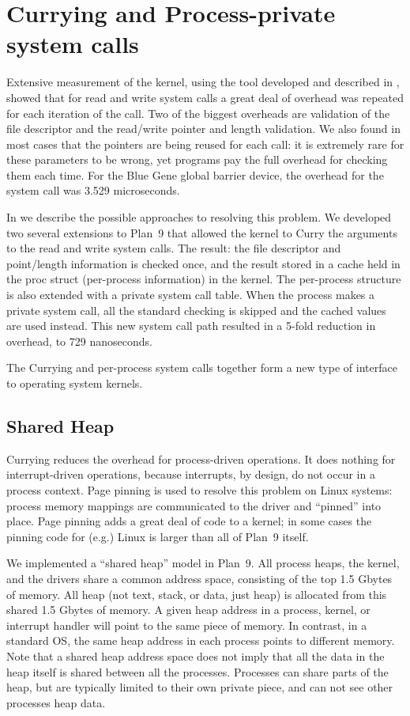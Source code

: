 \section{Currying and Process-private system calls}
Extensive measurement of the kernel, using the tool developed and described in \cite{plan9trace}, showed
that for read and write system calls a great deal of overhead was repeated for each iteration of the 
call. Two of the biggest overheads are validation of the file descriptor and the read/write pointer and 
length validation. We also found in most cases that the pointers are being reused for each call: it is extremely rare for these parameters to be wrong, yet programs pay the full overhead for checking them 
each time. For the Blue Gene global barrier device, the overhead for the system call was 3.529 microseconds. 

In \cite{currying} we describe the possible approaches to resolving this problem. We developed two 
several extensions to Plan~9 that allowed the kernel to Curry the arguments to the read and write
system calls. The result: the file descriptor and point/length information is checked once, and the
result stored in a cache held in the proc struct (per-process information) in the kernel. The per-process structure is 
also extended with a private system call table. When the process makes a private system
call, all the standard checking is skipped and the cached values are used instead. This 
new system call path resulted in a 5-fold reduction in overhead, to 729 nanoseconds. 

The Currying and per-process system calls together form a new type of interface to operating system
kernels. 

\subsection{Shared Heap}
Currying reduces the overhead for process-driven operations. It does nothing for interrupt-driven
operations, because interrupts, by design, do not occur in a process context. Page pinning is used 
to resolve this problem on Linux systems: process memory mappings are communicated to the driver
and ``pinned'' into place. Page pinning adds a great deal of code to a kernel; in some cases the
pinning code for (e.g.) Linux is larger than all of Plan~9 itself. 

We implemented a ``shared heap'' model in Plan~9. All process heaps, the kernel, and the drivers 
share a common address space, consisting of the top 1.5 Gbytes of memory. All heap (not text, stack,
or data, 
just heap) is allocated from this shared 1.5 Gbytes of memory. 
A given heap address in a process, kernel, or interrupt handler will
point to the same piece of memory. In contrast, in a standard OS, the same heap address in each 
process points to different memory. Note that a shared heap address space does not imply that 
all the data in the heap itself is shared between all the processes.  
Processes can share parts of the heap, but are typically limited to their own private piece, and 
can not see other processes heap data. 

